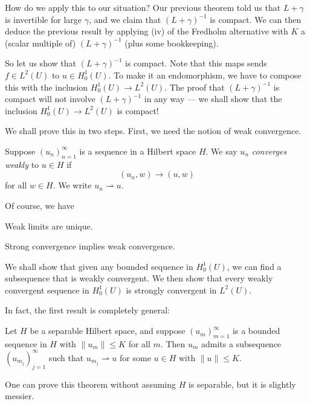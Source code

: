 \documentclass[a4paper]{article}
\begin{document}
How do we apply this to our situation? Our previous theorem told us that $L + \gamma$ is invertible for large $\gamma$, and we claim that $(L + \gamma)^{-1}$ is compact. We can then deduce the previous result by applying (iv) of the Fredholm alternative with $K$ a (scalar multiple of) $(L + \gamma)^{-1}$ (plus some bookkeeping).

So let us show that $(L + \gamma)^{-1}$ is compact. Note that this maps sends $f \in L^2(U)$ to $u \in H_0^1(U)$. To make it an endomorphism, we have to compose this with the inclusion $H_0^1(U) \to L^2(U)$. The proof that $(L + \gamma)^{-1}$ is compact will not involve $(L + \gamma)^{-1}$ in any way --- we shall show that the inclusion $H_0^1(U) \to L^2(U)$ is compact!

We shall prove this in two steps. First, we need the notion of weak convergence.

\begin{defi}
  Suppose $(u_n)_{n = 1}^\infty$ is a sequence in a Hilbert space $H$. We say $u_n$ \emph{converges weakly} to $u \in H$ if
  \[
    (u_n, w) \to (u, w)
  \]
  for all $w \in H$. We write $u_n \rightharpoonup u$.
\end{defi}

Of course, we have
\begin{lemma}
  Weak limits are unique.\fakeqed
\end{lemma}

\begin{lemma}
  Strong convergence implies weak convergence.\fakeqed
\end{lemma}

We shall show that given any bounded sequence in $H_0^1(U)$, we can find a subsequence that is weakly convergent. We then show that every weakly convergent sequence in $H_0^1(U)$ is strongly convergent in $L^2(U)$.

In fact, the first result is completely general:
\begin{thm}
  Let $H$ be a separable Hilbert space, and suppose $(u_m)_{m = 1}^\infty$ is a bounded sequence in $H$ with $\|u_m\| \leq K$ for all $m$. Then $u_m$ admits a subsequence $(u_{m_j})_{j = 1}^\infty$ such that $u_{m_j} \rightharpoonup u$ for some $u \in H$ with $\|u\| \leq K$.
\end{thm}
One can prove this theorem without assuming $H$ is separable, but it is slightly messier.
\end{document}
